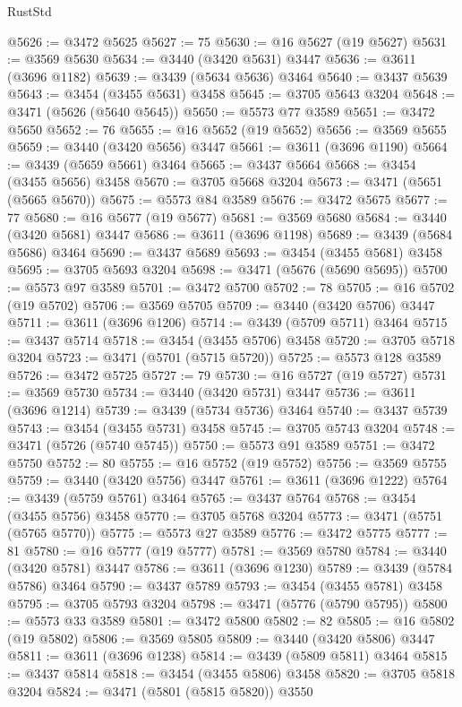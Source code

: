 \begin{lexlean}{RustStd}
\begin{coremodule}
{{{{{{{{{{{{{{{{{{{@5626 := @3472 @5625
@5627 := 75
@5630 := @16 @5627 (@19 @5627)
@5631 := @3569 @5630
@5634 := @3440 (@3420 @5631) @3447
@5636 := @3611 (@3696 @1182)
@5639 := @3439 (@5634 @5636) @3464
@5640 := @3437 @5639
@5643 := @3454 (@3455 @5631) @3458
@5645 := @3705 @5643 @3204
@5648 := @3471 (@5626 (@5640 @5645))
@5650 := @5573 @77 @3589
@5651 := @3472 @5650
@5652 := 76
@5655 := @16 @5652 (@19 @5652)
@5656 := @3569 @5655
@5659 := @3440 (@3420 @5656) @3447
@5661 := @3611 (@3696 @1190)
@5664 := @3439 (@5659 @5661) @3464
@5665 := @3437 @5664
@5668 := @3454 (@3455 @5656) @3458
@5670 := @3705 @5668 @3204
@5673 := @3471 (@5651 (@5665 @5670))
@5675 := @5573 @84 @3589
@5676 := @3472 @5675
@5677 := 77
@5680 := @16 @5677 (@19 @5677)
@5681 := @3569 @5680
@5684 := @3440 (@3420 @5681) @3447
@5686 := @3611 (@3696 @1198)
@5689 := @3439 (@5684 @5686) @3464
@5690 := @3437 @5689
@5693 := @3454 (@3455 @5681) @3458
@5695 := @3705 @5693 @3204
@5698 := @3471 (@5676 (@5690 @5695))
@5700 := @5573 @97 @3589
@5701 := @3472 @5700
@5702 := 78
@5705 := @16 @5702 (@19 @5702)
@5706 := @3569 @5705
@5709 := @3440 (@3420 @5706) @3447
@5711 := @3611 (@3696 @1206)
@5714 := @3439 (@5709 @5711) @3464
@5715 := @3437 @5714
@5718 := @3454 (@3455 @5706) @3458
@5720 := @3705 @5718 @3204
@5723 := @3471 (@5701 (@5715 @5720))
@5725 := @5573 @128 @3589
@5726 := @3472 @5725
@5727 := 79
@5730 := @16 @5727 (@19 @5727)
@5731 := @3569 @5730
@5734 := @3440 (@3420 @5731) @3447
@5736 := @3611 (@3696 @1214)
@5739 := @3439 (@5734 @5736) @3464
@5740 := @3437 @5739
@5743 := @3454 (@3455 @5731) @3458
@5745 := @3705 @5743 @3204
@5748 := @3471 (@5726 (@5740 @5745))
@5750 := @5573 @91 @3589
@5751 := @3472 @5750
@5752 := 80
@5755 := @16 @5752 (@19 @5752)
@5756 := @3569 @5755
@5759 := @3440 (@3420 @5756) @3447
@5761 := @3611 (@3696 @1222)
@5764 := @3439 (@5759 @5761) @3464
@5765 := @3437 @5764
@5768 := @3454 (@3455 @5756) @3458
@5770 := @3705 @5768 @3204
@5773 := @3471 (@5751 (@5765 @5770))
@5775 := @5573 @27 @3589
@5776 := @3472 @5775
@5777 := 81
@5780 := @16 @5777 (@19 @5777)
@5781 := @3569 @5780
@5784 := @3440 (@3420 @5781) @3447
@5786 := @3611 (@3696 @1230)
@5789 := @3439 (@5784 @5786) @3464
@5790 := @3437 @5789
@5793 := @3454 (@3455 @5781) @3458
@5795 := @3705 @5793 @3204
@5798 := @3471 (@5776 (@5790 @5795))
@5800 := @5573 @33 @3589
@5801 := @3472 @5800
@5802 := 82
@5805 := @16 @5802 (@19 @5802)
@5806 := @3569 @5805
@5809 := @3440 (@3420 @5806) @3447
@5811 := @3611 (@3696 @1238)
@5814 := @3439 (@5809 @5811) @3464
@5815 := @3437 @5814
@5818 := @3454 (@3455 @5806) @3458
@5820 := @3705 @5818 @3204
@5824 := @3471 (@5801 (@5815 @5820)) @3550
}}}}}}}}}}}}}}}}}}}
\end{coremodule}
\end{lexlean}
